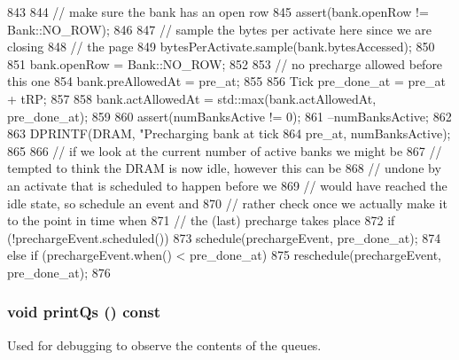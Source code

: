 \begin{DoxyCode}
843 {
844     // make sure the bank has an open row
845     assert(bank.openRow != Bank::NO_ROW);
846 
847     // sample the bytes per activate here since we are closing
848     // the page
849     bytesPerActivate.sample(bank.bytesAccessed);
850 
851     bank.openRow = Bank::NO_ROW;
852 
853     // no precharge allowed before this one
854     bank.preAllowedAt = pre_at;
855 
856     Tick pre_done_at = pre_at + tRP;
857 
858     bank.actAllowedAt = std::max(bank.actAllowedAt, pre_done_at);
859 
860     assert(numBanksActive != 0);
861     --numBanksActive;
862 
863     DPRINTF(DRAM, "Precharging bank at tick %
864             pre_at, numBanksActive);
865 
866     // if we look at the current number of active banks we might be
867     // tempted to think the DRAM is now idle, however this can be
868     // undone by an activate that is scheduled to happen before we
869     // would have reached the idle state, so schedule an event and
870     // rather check once we actually make it to the point in time when
871     // the (last) precharge takes place
872     if (!prechargeEvent.scheduled())
873         schedule(prechargeEvent, pre_done_at);
874     else if (prechargeEvent.when() < pre_done_at)
875         reschedule(prechargeEvent, pre_done_at);
876 }
\end{DoxyCode}
\hypertarget{classDRAMCtrl_a3c5f01de2fe3a6826581f3641cac2ba7}{
\subsubsection[{printQs}]{\setlength{\rightskip}{0pt plus 5cm}void printQs () const}}
\label{classDRAMCtrl_a3c5f01de2fe3a6826581f3641cac2ba7}
Used for debugging to observe the contents of the queues. 


